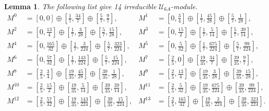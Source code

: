 \documentclass{article}
\newtheorem{lemma}{Lemma}[section]
\begin{document}
	\begin{lemma} \label{Real modules} The following list give 14 irreducible
		$\mathcal{U}_{6A}$-module.
		\begin{align*}
			M^{0} & =\left[0,0\right]\oplus\left[\frac{1}{7},\frac{34}{7}\right]\oplus\left[\frac{5}{7},\frac{9}{7}\right], & M^{1} & =\left[0,\frac{3}{4}\right]\oplus\left[\frac{1}{7},\frac{45}{28}\right]\oplus\left[\frac{5}{7},\frac{1}{28}\right],\\
			M^{2} & =\left[0,\frac{13}{4}\right]\oplus\left[\frac{1}{7},\frac{3}{28}\right]\oplus\left[\frac{5}{7},\frac{15}{28}\right], & M^{3} & =\left[0,\frac{15}{2}\right]\oplus\left[\frac{1}{7},\frac{5}{14}\right]\oplus\left[\frac{5}{7},\frac{39}{14}\right],\\
			M^{4} & =\left[0,\frac{165}{32}\right]\oplus\left[\frac{1}{7},\frac{3}{224}\right]\oplus\left[\frac{5}{7},\frac{323}{224}\right], & M^{5} & =\left[0,\frac{5}{32}\right]\oplus\left[\frac{1}{7},\frac{675}{224}\right]\oplus\left[\frac{5}{7},\frac{99}{224}\right],\\
			M^{6} & =\left[0,\frac{57}{32}\right]\oplus\left[\frac{1}{7},\frac{143}{224}\right]\oplus\left[\frac{5}{7},\frac{15}{224}\right], & M^{7} & =\left[\frac{2}{5},0\right]\oplus\left[\frac{19}{35},\frac{34}{7}\right]\oplus\left[\frac{39}{35},\frac{9}{7}\right],\\
			M^{8} & =\left[\frac{2}{5},\frac{3}{4}\right]\oplus\left[\frac{19}{35},\frac{45}{28}\right]\oplus\left[\frac{39}{35},\frac{1}{28}\right], & M^{9} & =\left[\frac{2}{5},\frac{13}{4}\right]\oplus\left[\frac{19}{35},\frac{3}{28}\right]\oplus\left[\frac{39}{35},\frac{15}{28}\right],\\
			M^{10} & =\left[\frac{2}{5},\frac{15}{2}\right]\oplus\left[\frac{19}{35},\frac{5}{14}\right]\oplus\left[\frac{39}{35},\frac{39}{14}\right], & M^{11} & =\left[\frac{2}{5},\frac{5}{32}\right]\oplus\left[\frac{19}{35},\frac{675}{224}\right]\oplus\left[\frac{39}{35},\frac{99}{224}\right],\\
			M^{12} & =\left[\frac{2}{5},\frac{57}{32}\right]\oplus\left[\frac{19}{35},\frac{143}{224}\right]\oplus\left[\frac{39}{35},\frac{15}{224}\right], & M^{13} & =\left[\frac{2}{5},\frac{165}{32}\right]\oplus\left[\frac{19}{35},\frac{3}{224}\right]\oplus\left[\frac{39}{35},\frac{323}{224}\right].
		\end{align*}
	\end{lemma}
	
	
\end{document}
